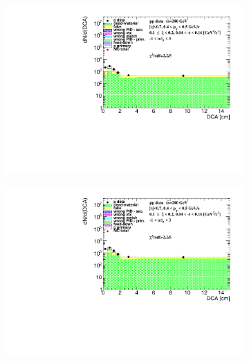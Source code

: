 \begin{figure}[h!]
\begin{subfigure}{.45\textwidth}
	\end{subfigure}
	\begin{subfigure}{.45\textwidth}
		\includegraphics[width=\linewidth, page=10]{chapters/chrgSTAR/img/DCAproton/background_p_2.pdf}
	\end{subfigure}
	\begin{subfigure}{.45\textwidth}
		\includegraphics[width=\linewidth, page=13]{chapters/chrgSTAR/img/DCAproton/background_p_2.pdf}
	\end{subfigure}
	\begin{subfigure}{.45\textwidth}

\end{subfigure}
\end{figure}
